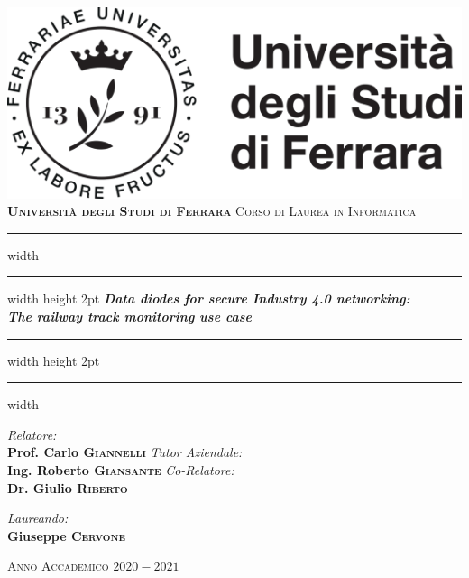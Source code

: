 \documentclass[a4paper, 12pt]{book}
\begin{document}

\begin{titlepage}
	\centering
	\includegraphics[]{logo.png}\\
	\vspace*{1cm}
	\huge \textbf{\textsc{Università degli Studi di Ferrara}}
	\Large \textsc{Corso di Laurea in Informatica}
	
	\vspace*{1.5cm}
	\hrule width \hsize \kern 1mm \hrule width \hsize height 2pt
	\vspace*{10mm}
	\Huge \emph{\textbf{Data diodes for secure Industry 4.0 networking: \\ The railway track monitoring use case}}
	\vspace*{10mm}
	\hrule width \hsize height 2pt
	\vspace*{1mm}
	\hrule width \hsize \kern 1mm
	
	\vspace*{5mm}
	\begin{minipage}{0.46\textwidth}
		\begin{flushleft} \Large
			\emph{Relatore:}\\
			\Large \textbf{Prof. Carlo \textsc{Giannelli}}
            \emph{Tutor Aziendale:}\\
			\Large \textbf{Ing. Roberto \textsc{Giansante}}
            \emph{Co-Relatore:}\\
			\Large \textbf{Dr. Giulio \textsc{Riberto}}
		\end{flushleft}
	\end{minipage}
	\begin{minipage}{0.45\textwidth}
		\begin{flushright} \Large
			\emph{Laureando:} \\
			\Large \textbf{Giuseppe \textsc{Cervone}}
		\end{flushright}
	\end{minipage}
	
	\vspace*{20mm}
	\Large \textsc{Anno Accademico $2020-2021$}
\end{titlepage}
\restoregeometry
\end{document}

